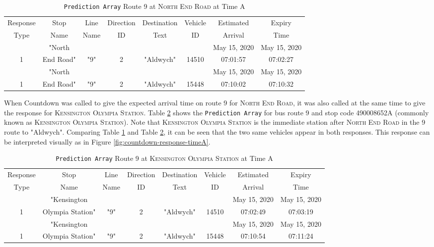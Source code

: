 \begin{table}[H]
    \centering
    \setlength\tabcolsep{2pt}
    \begin{tabular}{|c|c|c|c|c|c|c|c|}
        \hline
          Response & Stop   &   Line & Direction & Destination & Vehicle & Estimated & Expiry \\[-3pt]
           Type & Name &    Name & ID &  Text & ID & Arrival &  Time \\
        \hline
             & "North &  &  &  &  & May 15, 2020  & May 15, 2020 \\[-3pt]
            1 & End Road" & "9" & 2 & "Aldwych" & 14510 & 07:01:57 & 07:02:27 \\
        \hline
             & "North &  &  &  &  & May 15, 2020 & May 15, 2020 \\[-3pt]
            1 & End Road" & "9" & 2 & "Aldwych" & 15448 & 07:10:02 & 07:10:32 \\
        \hline
        \end{tabular}
    \caption{\texttt{Prediction Array} Route 9 at \textsc{North End Road} at Time A}
    \label{table:prediction-array-stopa}
\end{table}

When Countdown was called to give the expected arrival time on route 9 for \textsc{North End Road}, it was also called at the same time to give the response for \textsc{Kensington Olympia Station}. Table \ref{table:prediction-array-stopb} shows the \texttt{Prediction Array} for bus route 9 and stop code 490008652A (commonly known as \textsc{Kensington Olympia Station}). Note that \textsc{Kensington Olympia Station} is the immediate station after \textsc{North End Road} in the 9 route to "Aldwych". Comparing Table \ref{table:prediction-array-stopa} and Table \ref{table:prediction-array-stopb}, it can be seen that the two same vehicles appear in both responses. This response can be interpreted visually as in Figure \ref{fig:countdown-response-timeA}.

\begin{table}[H]
    \centering
    \setlength\tabcolsep{2pt}
    \begin{tabular}{|c|c|c|c|c|c|c|c|}
        \hline
          Response & Stop   &   Line & Direction & Destination & Vehicle & Estimated & Expiry \\[-3pt]
            Type & Name &    Name & ID &  Text & ID & Arrival &  Time \\
        \hline
             & "Kensington &  &  &  &  & May 15, 2020 & May 15, 2020 \\[-3pt]
            1 & Olympia Station" & "9" & 2 & "Aldwych" & 14510 & 07:02:49 & 07:03:19 \\
        \hline
             & "Kensington &  &  &  &  & May 15, 2020 & May 15, 2020 \\[-3pt]
            1 & Olympia Station" & "9" & 2 & "Aldwych" & 15448 & 07:10:54 & 07:11:24 \\
        \hline
        \end{tabular}
    \caption{\texttt{Prediction Array} Route 9 at \textsc{Kensington Olympia Station} at Time A}
    \label{table:prediction-array-stopb}
\end{table}

